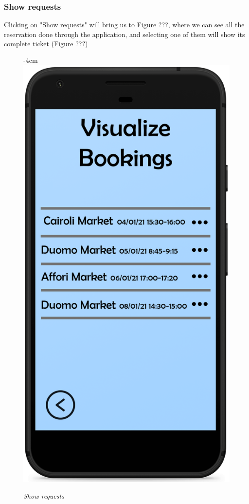\documentclass{article}
\begin{document}
		\newpage
		
		\subsubsection{Show requests}
		
		Clicking on "Show requests" will bring us to Figure ???, where we can see all the reservation done through the application, and selecting one of them will show its complete ticket (Figure ???)
		
		\begin{figure}[H]
			\begin{adjustwidth} {-4cm}{}
				\centering
				\includegraphics[scale=0.45]{../Mockups/VisualizeBookings.png}\\
			\end{adjustwidth}
			\caption{\emph{Show requests}}
		\end{figure}
	
\end{document}
